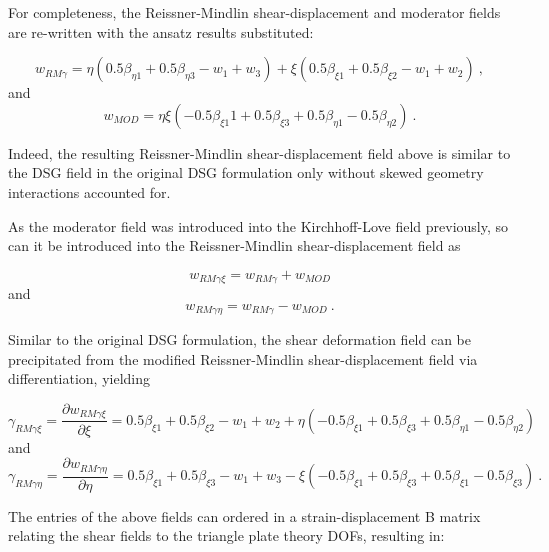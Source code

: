 For completeness, the Reissner-Mindlin shear-displacement and moderator fields are re-written with the ansatz results substituted:

\begin{equation} 
w_{RM \gamma} = \eta(0.5 \beta_{\eta 1} + 0.5\beta_{\eta 3} - w_1 + w_3) + \xi(0.5\beta_{\xi 1} + 0.5\beta_{\xi 2} - w_1 + w_2)
\label{eqDSGc3_21}\ ,
\end{equation}
and
\begin{equation} 
w_{MOD} = \eta\xi(-0.5\beta_{\xi 1}1 + 0.5\beta_{\xi 3} + 0.5\beta_{\eta 1} - 0.5\beta_{\eta 2})
\label{eqDSGc3_22}\ .
\end{equation}

Indeed, the resulting Reissner-Mindlin shear-displacement field above is similar to the DSG field in the original DSG formulation only without skewed geometry interactions accounted for.

As the moderator field was introduced into the Kirchhoff-Love field previously, so can it be introduced into the Reissner-Mindlin shear-displacement field as

\begin{equation} 
w_{RM \gamma \xi} = w_{RM \gamma} + w_{MOD} 
\label{eqDSGc3_6}
\end{equation}
and
\begin{equation} 
w_{RM \gamma \eta} = w_{RM \gamma} - w_{MOD} 
\label{eqDSGc3_7}\ .
\end{equation}

Similar to the original DSG formulation, the shear deformation field can be precipitated from the modified Reissner-Mindlin shear-displacement field via differentiation, yielding

\begin{equation} 
\gamma_{RM \gamma \xi} = \frac{\partial w_{RM \gamma \xi}}{\partial \xi}  = 0.5\beta_{\xi 1} + 0.5\beta_{\xi 2} - w_1 + w_2 + \eta(-0.5\beta_{\xi 1} + 0.5\beta_{\xi 3} + 0.5\beta_{\eta 1} - 0.5\beta_{\eta 2})
\label{eqDSGc3_23}
\end{equation} 
and
\begin{equation} 
\gamma_{RM \gamma \eta} = \frac{\partial w_{RM \gamma \eta}}{\partial \eta}  = 0.5\beta_{\xi 1} + 0.5\beta_{\xi 3} - w_1 + w_3 - \xi(-0.5\beta_{\xi 1} + 0.5\beta_{\xi 3} + 0.5\beta_{\xi 1} - 0.5\beta_{\xi 3})
\label{eqDSGc3_25}\ .
\end{equation}

The entries of the above fields can ordered in a strain-displacement B matrix relating the shear fields to the triangle plate theory DOFs, resulting in:

